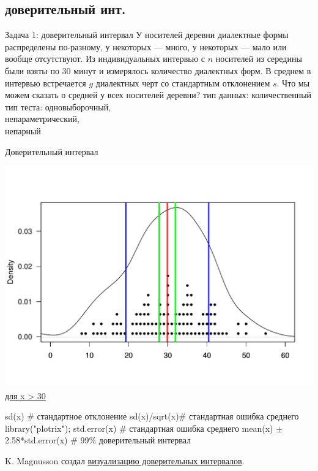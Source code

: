 \subsection{доверительный инт.}
\begin{frame}{Задача 1: доверительный интервал}
У носителей деревни диалектные формы распределены по-разному, у некоторых — много, у некоторых —  мало или вообще отсутствуют. Из индивидуальных интервью с $n$ носителей из середины были взяты по 30 минут и измерялось количество диалектных форм. В среднем в интервью встречается $g$ диалектных черт со стандартным отклонением $s$. Что мы можем сказать о средней у всех носителей деревни? \pause 
\vfill
тип данных: количественный\\
тип теста: одновыборочный,\\
непараметрический,\\
непарный
\end{frame}
\begin{frame}{Доверительный интервал}
\begin{center}
\vspace{-4mm}
\includegraphics[width=0.71\linewidth]{confint.pdf}
{\Large \hfill \underline{для x > 30}}
\end{center}
\begin{itemize}
\mytem {\color{red}{mean(x) \hfill \# среднее}}
\mytem \alert{sd(x) \hfill \# стандартное отклонение}
\mytem sd(x)/sqrt(x)\hfill \# стандартная ошибка среднего
\mytem library("plotrix"); std.error(x) \hfill \# стандартная ошибка среднего
\mytem {\color{green}{mean(x) $\pm$ 1.96*std.error(x) \hfill \# 95\% доверительный интервал}}
\mytem mean(x) $\pm$ 2.58*std.error(x) \hfill \# 99\% доверительный интервал
\end{itemize}
K. Magnusson создал \alert{\href{http://rpsychologist.com/d3/CI/}{визуализацию доверительных интервалов}}.
\bigskip
\end{frame}

